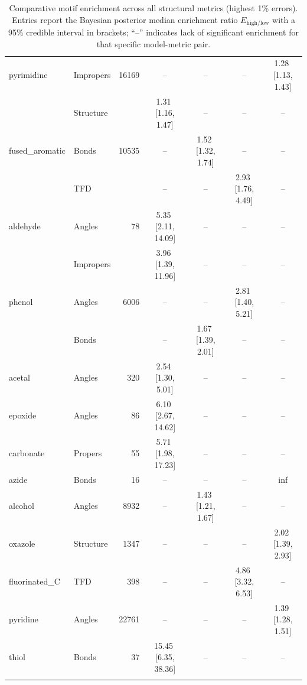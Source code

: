 \begin{longtable}[c]{ ll | r | c c c c}
    \hline
    pyrimidine & Impropers & 16169 & -- & -- & -- & 1.28\,\,[1.13, 1.43] \\
     & Structure &  & 1.31\,\,[1.16, 1.47] & -- & -- & -- \\
    \hline
    fused\_aromatic & Bonds & 10535 & -- & 1.52\,\,[1.32, 1.74] & -- & -- \\
     & TFD &  & -- & -- & 2.93\,\,[1.76, 4.49] & -- \\
    \hline
    aldehyde & Angles & 78 & 5.35\,\,[2.11, 14.09] & -- & -- & -- \\
     & Impropers &  & 3.96\,\,[1.39, 11.96] & -- & -- & -- \\
    \hline
    phenol & Angles & 6006 & -- & -- & 2.81\,\,[1.40, 5.21] & -- \\
     & Bonds &  & -- & 1.67\,\,[1.39, 2.01] & -- & -- \\
    \hline
    acetal & Angles & 320 & 2.54\,\,[1.30, 5.01] & -- & -- & -- \\
    \hline
    epoxide & Angles & 86 & 6.10\,\,[2.67, 14.62] & -- & -- & -- \\
    \hline
    carbonate & Propers & 55 & 5.71\,\,[1.98, 17.23] & -- & -- & -- \\
    \hline
    azide & Bonds & 16 & -- & -- & -- & inf \\
    \hline
    alcohol & Angles & 8932 & -- & 1.43\,\,[1.21, 1.67] & -- & -- \\
    \hline
    oxazole & Structure & 1347 & -- & -- & -- & 2.02\,\,[1.39, 2.93] \\
    \hline
    fluorinated\_C & TFD & 398 & -- & -- & 4.86\,\,[3.32, 6.53] & -- \\
    \hline
    pyridine & Angles & 22761 & -- & -- & -- & 1.39\,\,[1.28, 1.51] \\
    \hline
    thiol & Bonds & 37 & 15.45\,\,[6.35, 38.36] & -- & -- & -- \\
    \hline
    \hline
    \caption{Comparative motif enrichment across all structural metrics (highest 1\% errors). Entries report the Bayesian posterior median enrichment ratio $E_{\mathrm{high/low}}$ with a 95\% credible interval in brackets; ``--'' indicates lack of significant enrichment for that specific model-metric pair.}
    \label{tab:agglutinated_worst}
\end{longtable}
\endgroup